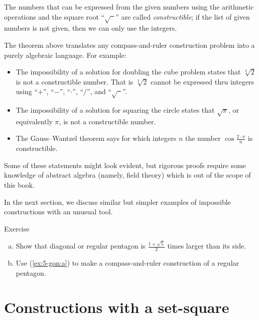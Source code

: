 The numbers that can be expressed from the given numbers using the arithmetic operations and the square root ``$\sqrt{\phantom{a}}$'' are called \emph{constructible};
if the list of given numbers is not given, then we can only use the integers.

{\sloppy
The theorem above translates any compass-and-ruler construction problem into a purely algebraic language.
For example:
\begin{itemize}
\item The impossibility of a solution for doubling the cube problem states that $\sqrt[3]{2}$ is not a constructible number.
That is $\sqrt[3]{2}$ cannot be expressed thru integers using
``$+$'', ``$-$'', ``$\cdot$'', ``$/$'', and ``$\sqrt{\phantom{a}}$''.

\item The impossibility of a solution for squaring the circle states that 
$\sqrt{\pi}$, or equivalently $\pi$, is not a constructible number.

\item The Gauss--Wantzel theorem says for which integers $n$ the number 
$\cos\tfrac{2\cdot\pi}n$ is constructible.
\end{itemize} 
Some of these statements might look evident, 
but rigorous proofs require some knowledge of abstract algebra (namely, field theory)
which is out of the scope of this book. 

}

In the next section, we discuss similar but simpler examples of impossible constructions with an unusual tool.

\begin{thm}{Exercise}\label{ex:5-gon}
\begin{enumerate}[(a)]
 \item\label{ex:5-gon:a} Show that diagonal or regular pentagon is $\tfrac{1+\sqrt5}2$ times larger than its side.
 \item\label{ex:5-gon:b} Use (\ref{ex:5-gon:a}) to make a compass-and-ruler construction of a regular pentagon.
\end{enumerate}
\end{thm}

\section*{Constructions with a set-square}

